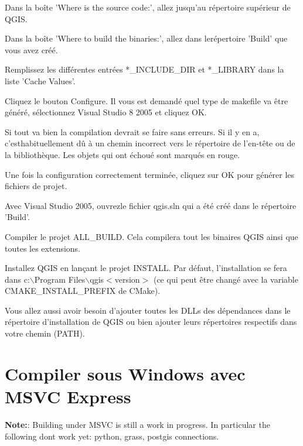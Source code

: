 Dans la bo\^ite 'Where is the source code:', allez jusqu'au r\'epertoire sup\'erieur de QGIS.

Dans la bo\^ite 'Where to build the binaries:', allez dans ler\'epertoire 'Build' que vous avez cr\'e\'e.

Remplissez les diff\'erentes entr\'ees *\_INCLUDE\_DIR et *\_LIBRARY dans la liste 'Cache Values'.

Cliquez le bouton Configure. Il vous est demand\'e quel type de makefile va \^etre g\'en\'er\'e, s\'electionnez Visual Studio 8 2005 et cliquez OK.

Si tout va bien la compilation devrait se faire sans erreurs. Si il y en a, c'esthabituellement d\^u \`a un chemin incorrect vers le r\'epertoire de l'en-t\^ete ou de la biblioth\`eque. Les objets qui ont \'echou\'e sont marqu\'es en rouge.

% 
% 
% 
% 

Une fois la configuration correctement termin\'ee, cliquez sur OK pour g\'en\'erer les fichiers de projet.

Avec Visual Studio 2005, ouvrezle fichier qgis.sln qui a \'et\'e cr\'e\'e dans le r\'epertoire 'Build'.

Compiler le projet ALL\_BUILD. Cela compilera tout les binaires QGIS ainsi que toutes les extensions.

Installez QGIS en lan\c{c}ant le projet INSTALL. Par d\'efaut, l'installation se fera dans c:$\backslash$Program Files$\backslash$qgis$<$version$>$ (ce qui peut \^etre chang\'e avec la variable CMAKE\_INSTALL\_PREFIX de CMake). 

Vous allez aussi avoir besoin d'ajouter toutes les DLLs des d\'ependances dans le r\'epertoire d'installation de QGIS ou bien ajouter leurs r\'epertoires respectifs dans votre chemin (PATH).

\section{Compiler sous Windows avec MSVC Express}
\textbf{Note:}: Building under MSVC is still a work in progress. In particular
the following dont work yet: python, grass, postgis connections.

